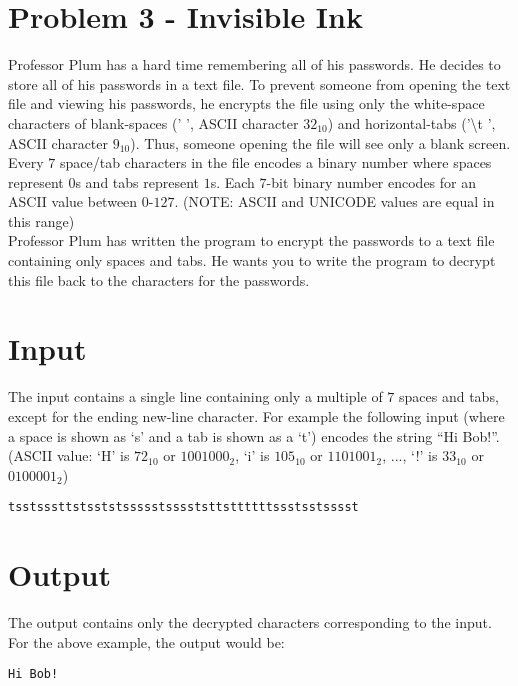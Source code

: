 \documentclass{article}
\begin{document}

\section*{Problem 3 - Invisible Ink}

Professor Plum has a hard time remembering all of his passwords. He decides to store all of his passwords in a text file. To prevent someone from opening the text file and viewing his passwords, he encrypts the file using only the white-space characters of blank-spaces ('\,\,', ASCII character $32_{10}$) and horizontal-tabs ('\textbackslash t ', ASCII character $9_{10}$). Thus, someone opening the file will see only a blank screen. \\

Every $7$ space/tab characters in the file encodes a binary number where spaces represent $0$s and tabs represent $1$s. Each $7$-bit binary number encodes for an ASCII value between $0$-$127$. (NOTE: ASCII and UNICODE values are equal in this range) \\ 

Professor Plum has written the program to encrypt the passwords to a text file containing only spaces and tabs.  He wants you to write the program to decrypt this file back to the characters for the passwords.

\section*{Input}
The input contains a single line containing only a multiple of $7$ spaces and tabs, except for the ending new-line character. For example the following input (where a space is shown as ‘s’ and a tab is shown as a ‘t’) encodes the string “Hi Bob!”.  (ASCII value: ‘H’ is $72_{10}$ or $1001000_2$, ‘i’ is $105_{10}$ or $1101001_2$, ..., ‘!’ is $33_{10}$ or $0100001_2$) 

\begin{verbatim}
tsstsssttstsststssssstsssststtsttttttssstsstsssst
\end{verbatim}

\section*{Output}
The output contains only the decrypted characters corresponding to the input.  For the above example, the output would be:

\begin{verbatim}
Hi Bob!
\end{verbatim}
\end{document}
